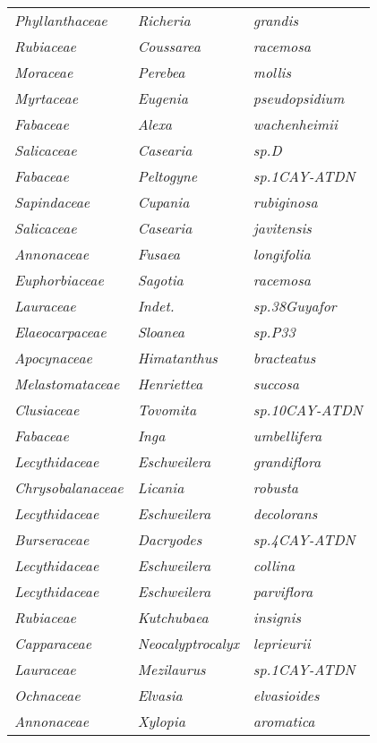 \documentclass[fleqn,10pt]{ArtEcoFoG} %
\renewenvironment{table}{\begin{table*}}{\end{table*}\ignorespacesafterend}
\begin{document}
\begin{table}
\begin{tabular}[t]{lll}
\em{Phyllanthaceae} & \em{Richeria} & \em{grandis}\\
\em{Rubiaceae} & \em{Coussarea} & \em{racemosa}\\
\em{Moraceae} & \em{Perebea} & \em{mollis}\\
\addlinespace
\em{Myrtaceae} & \em{Eugenia} & \em{pseudopsidium}\\
\em{Fabaceae} & \em{Alexa} & \em{wachenheimii}\\
\em{Salicaceae} & \em{Casearia} & \em{sp.D}\\
\em{Fabaceae} & \em{Peltogyne} & \em{sp.1CAY-ATDN}\\
\em{Sapindaceae} & \em{Cupania} & \em{rubiginosa}\\
\addlinespace
\em{Salicaceae} & \em{Casearia} & \em{javitensis}\\
\em{Annonaceae} & \em{Fusaea} & \em{longifolia}\\
\em{Euphorbiaceae} & \em{Sagotia} & \em{racemosa}\\
\em{Lauraceae} & \em{Indet.} & \em{sp.38Guyafor}\\
\em{Elaeocarpaceae} & \em{Sloanea} & \em{sp.P33}\\
\addlinespace
\em{Apocynaceae} & \em{Himatanthus} & \em{bracteatus}\\
\em{Melastomataceae} & \em{Henriettea} & \em{succosa}\\
\em{Clusiaceae} & \em{Tovomita} & \em{sp.10CAY-ATDN}\\
\em{Fabaceae} & \em{Inga} & \em{umbellifera}\\
\em{Lecythidaceae} & \em{Eschweilera} & \em{grandiflora}\\
\addlinespace
\em{Chrysobalanaceae} & \em{Licania} & \em{robusta}\\
\em{Lecythidaceae} & \em{Eschweilera} & \em{decolorans}\\
\em{Burseraceae} & \em{Dacryodes} & \em{sp.4CAY-ATDN}\\
\em{Lecythidaceae} & \em{Eschweilera} & \em{collina}\\
\em{Lecythidaceae} & \em{Eschweilera} & \em{parviflora}\\
\addlinespace
\em{Rubiaceae} & \em{Kutchubaea} & \em{insignis}\\
\em{Capparaceae} & \em{Neocalyptrocalyx} & \em{leprieurii}\\
\em{Lauraceae} & \em{Mezilaurus} & \em{sp.1CAY-ATDN}\\
\em{Ochnaceae} & \em{Elvasia} & \em{elvasioides}\\
\em{Annonaceae} & \em{Xylopia} & \em{aromatica}\\

\end{tabular}
\end{table}
\end{document}
